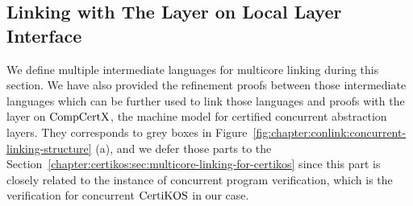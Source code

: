 
\subsection{Linking with The Layer on Local Layer Interface}
\label{chapter:linking:subsec:linking-with-the-layer-on-local-layer-interface}


We define multiple intermediate languages for multicore linking during this section.
We have also provided the refinement proofs between those intermediate languages which can be further used to link those languages and proofs with the layer on $\mathrm{CompCertX}$, the machine model for certified concurrent abstraction layers.
They corresponds to grey boxes in Figure~\ref{fig:chapter:conlink:concurrent-linking-structure} (a),
and we defer those parts to the Section~\ref{chapter:certikos:sec:multicore-linking-for-certikos} since  this part 
is closely related to the instance of concurrent program verification, which is the verification for concurrent $\mathrm{CertiKOS}$ in our case. 